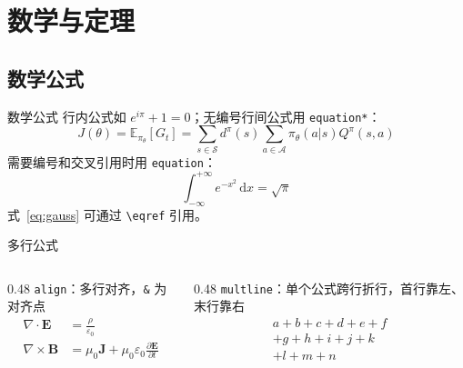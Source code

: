 \documentclass[aspectratio=169]{beamer}
\begin{document}
\section{数学与定理}

\subsection{数学公式}

\begin{frame}{数学公式}
    行内公式如 \(e^{i\pi}+1=0\)；无编号行间公式用 \texttt{equation*}：
    \begin{equation*}
        J(\theta) = \mathbb{E}_{\pi_\theta}[G_t]
        = \sum_{s\in\mathcal{S}} d^\pi(s)\sum_{a\in\mathcal{A}}
        \pi_\theta(a|s)Q^\pi(s,a)
    \end{equation*}
    需要编号和交叉引用时用 \texttt{equation}：
    \begin{equation}
        \int_{-\infty}^{+\infty} e^{-x^2}\,\mathrm{d}x = \sqrt{\pi}
        \label{eq:gauss}
    \end{equation}
    式~\eqref{eq:gauss} 可通过 \texttt{\textbackslash eqref} 引用。
\end{frame}

\begin{frame}{多行公式}
    \begin{columns}[t]
        \begin{column}{0.48\textwidth}
            \texttt{align}：多行对齐，\texttt{\&} 为对齐点
            \begin{align}
                \nabla\cdot\mathbf{E}  & = \frac{\rho}{\varepsilon_0} \\
                \nabla\times\mathbf{B} & = \mu_0\mathbf{J}
                + \mu_0\varepsilon_0\frac{\partial\mathbf{E}}{\partial t}
            \end{align}
        \end{column}
        \begin{column}{0.48\textwidth}
            \texttt{multline}：单个公式跨行折行，首行靠左、末行靠右
            \begin{multline}
                a+b+c+d+e+f \\
                +g+h+i+j+k \\
                +l+m+n
            \end{multline}
        \end{column}
    \end{columns}
\end{frame}
\end{document}
